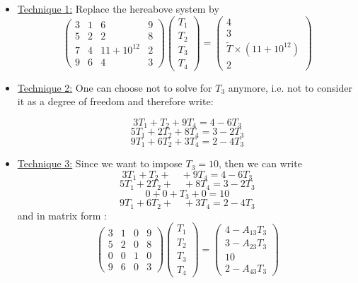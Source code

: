 \begin{itemize}

\item \underline{Technique 1:} Replace the hereabove system by
\[
\left(
\begin{array}{cccc}
3 & 1 & 6  & 9 \\
5 & 2 & 2  & 8 \\
7 & 4 & 11 +  10^{12} & 2 \\
9 & 6 & 4  & 3
\end{array}
\right)
\left(
\begin{array}{c}
T_1 \\ T_2 \\ T_3 \\ T_4
\end{array}
\right)
=
\left(
\begin{array}{c}
4 \\ 3 \\ \tilde{T}\times (11 + 10^{12}) \\ 2
\end{array}
\right)
\]




\item \underline{Technique 2:} One can choose not to solve for $T_3$ anymore, i.e. not to consider it as a degree of freedom and therefore write:

\[
3 T_1 + T_2 + 9 T_4 = 4 - 6T_3
\]
\[
5 T_1 + 2T_2 + 8 T_4 = 3 - 2T_3
\]
\[
9 T_1 + 6T_2 +  3 T_4 = 2 - 4T_3
\]


\item \underline{Technique 3:} Since we want to impose $T_3=10$, then we can write 
\[
3 T_1 + T_2 + \quad  + 9 T_4 = 4 - 6T_3
\]
\[
5 T_1 + 2T_2 + \quad + 8 T_4 = 3 - 2T_3
\]
\[
0 + 0 + T_3 + 0 = 10
\]
\[
9 T_1 + 6T_2 + \quad + 3 T_4 = 2 - 4T_3
\]
and in matrix form :
\[
\left(
\begin{array}{cccc}
3 & 1 & 0  & 9 \\
5 & 2 & 0  & 8 \\
0 & 0 & 1 & 0 \\
9 & 6 & 0  & 3
\end{array}
\right)
\left(
\begin{array}{c}
T_1 \\ T_2 \\ T_3 \\ T_4
\end{array}
\right)
=
\left(
\begin{array}{c}
4 - A_{13} T_3\\ 3 - A_{23}T_3 \\ 10 \\ 2-A_{43} T_3
\end{array}
\right)
\]

\end{itemize}

